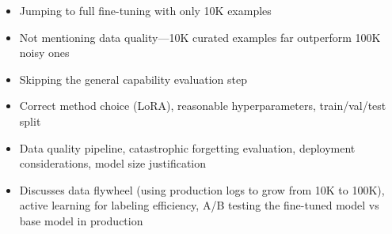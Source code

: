 \begin{interviewq}
\redflags
\begin{itemize}
    \item Jumping to full fine-tuning with only 10K examples
    \item Not mentioning data quality---10K curated examples far outperform 100K noisy ones
    \item Skipping the general capability evaluation step
\end{itemize}


\goodgreat
\begin{itemize}
    \item {} Correct method choice (LoRA), reasonable hyperparameters, train/val/test split
    \item {} Data quality pipeline, catastrophic forgetting evaluation, deployment considerations, model size justification
    \item {} Discusses data flywheel (using production logs to grow from 10K to 100K), active learning for labeling efficiency, A/B testing the fine-tuned model vs base model in production
\end{itemize}

\end{interviewq}

